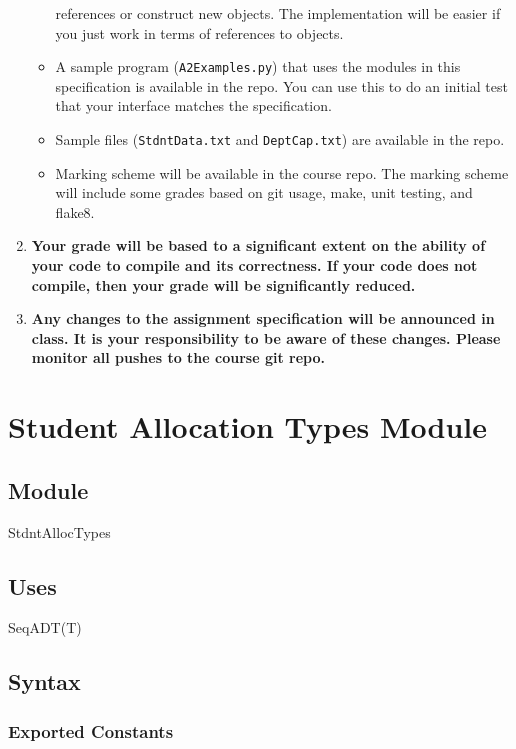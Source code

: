 \documentclass[12pt]{article}
\begin{document}
\begin{enumerate}
\begin{itemize}
  references or construct new objects.  The implementation will be easier if you
  just work in terms of references to objects.
\item A sample program (\texttt{A2Examples.py}) that uses the modules in this
  specification is available in the repo.  You can use this to do an initial
  test that your interface matches the specification.
\item Sample files (\texttt{StdntData.txt} and \texttt{DeptCap.txt}) are
  available in the repo.
\item Marking scheme will be available in the course repo.  The marking scheme
  will include some grades based on git usage, make, unit testing, and flake8.
\end{itemize}
\item \textbf{Your grade will be based to a significant extent on the ability of
    your code to compile and its correctness.  If your code does not compile,
    then your grade will be significantly reduced.}
\item \textbf{Any changes to the assignment specification will be announced in
    class.  It is your responsibility to be aware of these changes.  Please
    monitor all pushes to the course git repo.}
\end{enumerate}

\newpage

\section* {Student Allocation Types Module}

\subsection*{Module}

StdntAllocTypes

\subsection* {Uses}

SeqADT(T)

\subsection* {Syntax}

\subsubsection* {Exported Constants}
\end{document}
